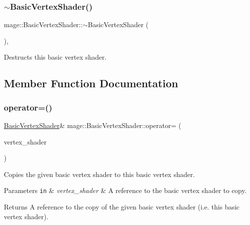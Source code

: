 \subsubsection{\texorpdfstring{$\sim$\+Basic\+Vertex\+Shader()}{~BasicVertexShader()}}
{\footnotesize\ttfamily mage\+::\+Basic\+Vertex\+Shader\+::$\sim$\+Basic\+Vertex\+Shader (\begin{DoxyParamCaption}{ }\end{DoxyParamCaption})\hspace{0.3cm}{\ttfamily [virtual]}, {\ttfamily [default]}}

Destructs this basic vertex shader. 

\subsection{Member Function Documentation}
\hypertarget{classmage_1_1_basic_vertex_shader_ab3d355e76715b24e21fb37c239d41932}{}\label{classmage_1_1_basic_vertex_shader_ab3d355e76715b24e21fb37c239d41932} 
\subsubsection{\texorpdfstring{operator=()}{operator=()}\hspace{0.1cm}{\footnotesize\ttfamily [1/2]}}
{\footnotesize\ttfamily \hyperlink{classmage_1_1_basic_vertex_shader}{Basic\+Vertex\+Shader}\& mage\+::\+Basic\+Vertex\+Shader\+::operator= (\begin{DoxyParamCaption}\item[{const \hyperlink{classmage_1_1_basic_vertex_shader}{Basic\+Vertex\+Shader} \&}]{vertex\+\_\+shader }\end{DoxyParamCaption})\hspace{0.3cm}{\ttfamily [delete]}}

Copies the given basic vertex shader to this basic vertex shader.


\begin{DoxyParams}[1]{Parameters}
\mbox{\tt in}  & {\em vertex\+\_\+shader} & A reference to the basic vertex shader to copy. \\
\hline
\end{DoxyParams}
\begin{DoxyReturn}{Returns}
A reference to the copy of the given basic vertex shader (i.\+e. this basic vertex shader). 
\end{DoxyReturn}
\hypertarget{classmage_1_1_basic_vertex_shader_ae5442c36b5f913ac6644cc2945a8c20a}{}\label{classmage_1_1_basic_vertex_shader_ae5442c36b5f913ac6644cc2945a8c20a} 
